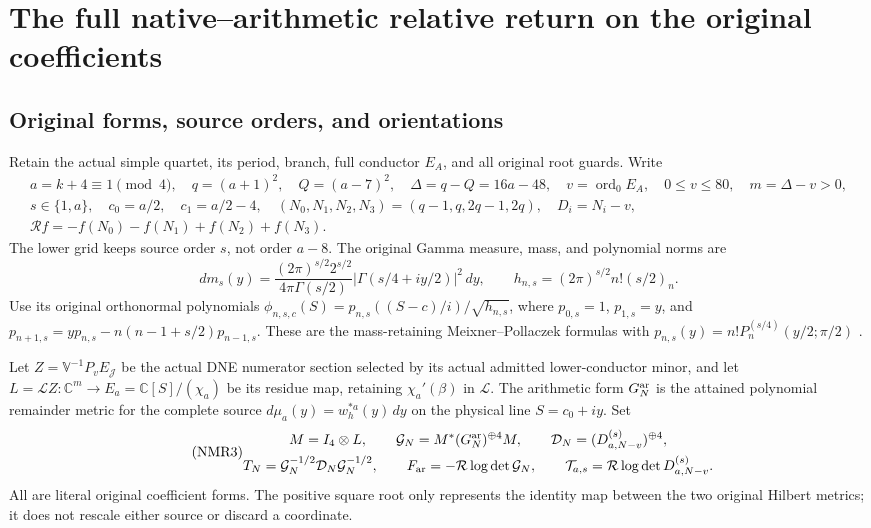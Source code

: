 \section{The full native--arithmetic relative return on the original coefficients}

\subsection{Original forms, source orders, and orientations}
Retain the actual simple quartet, its period, branch, full conductor
$E_A$, and all original root guards. Write
\begin{equation}\tag{NMR1}\label{nmr:domain}
\begin{gathered}
a=k+4\equiv1\pmod4,\quad q=(a+1)^2,\quad Q=(a-7)^2,\quad
\Delta=q-Q=16a-48,\quad v=\operatorname{ord}_0E_A,\quad
0\leq v\leq80,\quad m=\Delta-v>0,\\
s\in\{1,a\},\quad c_0=a/2,\quad c_1=a/2-4,\quad
(N_0,N_1,N_2,N_3)=(q-1,q,2q-1,2q),\quad D_i=N_i-v,\\
\mathcal R f=-f(N_0)-f(N_1)+f(N_2)+f(N_3).
\end{gathered}
\end{equation}
The lower grid keeps source order $s$, not order $a-8$.
The original Gamma measure, mass, and polynomial norms are
\begin{equation}\tag{NMR2}\label{nmr:gamma}
dm_s(y)=\frac{(2\pi)^{s/2}2^{s/2}}{4\pi\Gamma(s/2)}
 |\Gamma(s/4+iy/2)|^2\,dy,\qquad
h_{n,s}=(2\pi)^{s/2}n!(s/2)_n .
\end{equation}
Use its original orthonormal polynomials
$\phi_{n,s,c}(S)=p_{n,s}((S-c)/i)/\sqrt{h_{n,s}}$,
where $p_{0,s}=1$, $p_{1,s}=y$, and
$p_{n+1,s}=yp_{n,s}-n(n-1+s/2)p_{n-1,s}$.
These are the mass-retaining Meixner--Pollaczek formulas with
$p_{n,s}(y)=n!P_n^{(s/4)}(y/2;\pi/2)$
\cite{human:dlmf18}.

Let $Z=\mathbb V^{-1}P_vE_{\mathcal J}$ be the actual DNE numerator
section selected by its actual admitted lower-conductor minor, and let
$L=\mathcal LZ:\mathbb C^m\to E_a=\mathbb C[S]/(\chi_a)$ be its
residue map, retaining $\chi_a'(\beta)$ in $\mathcal L$.
The arithmetic form $G_N^{\rm ar}$ is the attained polynomial
remainder metric for the complete source
$d\mu_a(y)=w_h^{*a}(y)\,dy$ on the physical line $S=c_0+iy$.
Set
\begin{equation}\tag{NMR3}\label{nmr:forms}
\begin{gathered}
M=I_4\otimes L,\qquad
\mathcal G_N=M^*(G_N^{\rm ar})^{\oplus4}M,\qquad
\mathcal D_N=(D_{a,N-v}^{(s)})^{\oplus4},\\
T_N=\mathcal G_N^{-1/2}\mathcal D_N\mathcal G_N^{-1/2},\qquad
F_{\rm ar}=-\mathcal R\log\det\mathcal G_N,\qquad
\mathcal T_{a,s}=\mathcal R\log\det D_{a,N-v}^{(s)} .
\end{gathered}
\end{equation}
All are literal original coefficient forms. The positive square root
only represents the identity map between the two original Hilbert
metrics; it does not rescale either source or discard a coordinate.

